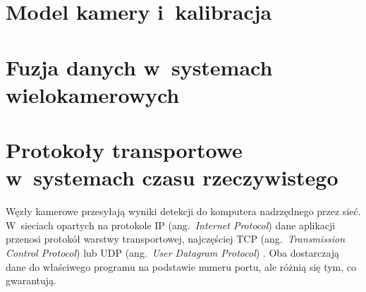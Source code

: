\section{Model kamery i~kalibracja}
\label{sec:model-kamery}


\section{Fuzja danych w~systemach wielokamerowych}
\label{sec:fuzja-teoria}



\section{Protokoły transportowe w~systemach czasu rzeczywistego}
\label{sec:protokoly}

Węzły kamerowe przesyłają wyniki detekcji do komputera nadrzędnego przez
sieć. W~sieciach opartych na protokole IP (ang.~\textit{Internet Protocol})
dane aplikacji przenosi protokół warstwy transportowej, najczęściej TCP
(ang.~\textit{Transmission Control Protocol}) lub UDP
(ang.~\textit{User Datagram Protocol}) \cite{kurose_2021}. Oba dostarczają
dane do właściwego programu na podstawie numeru portu, ale różnią się tym,
co gwarantują.

